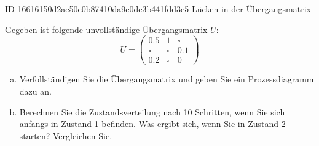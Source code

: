\begin{exercise}
      {ID-16616150d2ac50e0b87410da9c0dc3b441fdd3e5}
      {Lücken in der Übergangsmatrix}
  \ifproblem\problem\par
    Gegeben ist folgende unvollständige
    Übergangsmatrix $U$:
    \begin{equation*}
      U=
      \begin{pmatrix}
        \num{0.5} & \num{1} & \square   \\
        \square   & \square & \num{0.1} \\
        \num{0.2} & \square & 0
      \end{pmatrix}
    \end{equation*}
    \begin{enumerate}[a)]
      \item Verfollständigen Sie die Übergangsmatrix
            und geben Sie ein Prozessdiagramm dazu an.
      \item Berechnen Sie die Zustandsverteilung nach
            \num{10} Schritten, wenn Sie sich anfangs
            in Zustand \num{1} befinden.
            Was ergibt sich, wenn Sie in Zustand
            \num{2} starten? Vergleichen Sie.
    \end{enumerate}
  \fi
\end{exercise}
